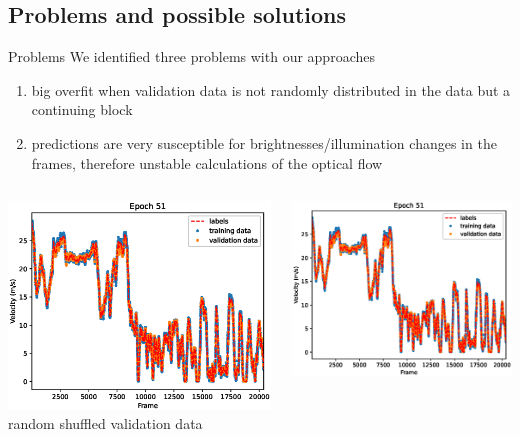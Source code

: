 \subsection{Problems and possible solutions}
\begin{frame}{Problems}
We identified three problems with our approaches
\begin{enumerate}
	\item big overfit when validation data is not randomly distributed in the data but a continuing block
	\item predictions are very susceptible for brightnesses/illumination changes in the frames, therefore unstable calculations of the optical flow
\end{enumerate}
\begin{columns}[c]
	\begin{column}{0.5\textwidth}
		\begin{center}
		\includegraphics[width=\textwidth]{imgs/siamese_performance.eps}
		random shuffled validation data
		\end{center}
	\end{column}
	\begin{column}{0.5\textwidth}
		\begin{center}
		\includegraphics[width=\textwidth]{imgs/siamese_performance.eps}

\end{center}
\end{column}
\end{columns}
\end{frame}
